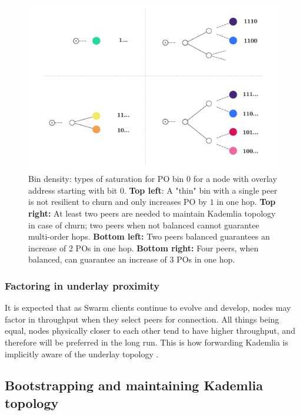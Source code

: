 \begin{figure}[htbp]
   \centering
   \includegraphics[width=\textwidth]{fig/bindensity.pdf}
   \caption[Bin density \statusgreen]{Bin density:  types of saturation for PO bin $0$ for a node with overlay address starting with bit $0$. \textbf{Top left}: A "thin" bin with a single peer is not resilient to churn and only increases PO by $1$ in one hop. \textbf{Top right:} At least two peers are needed to maintain Kademlia topology in case of churn; two peers when not balanced cannot guarantee multi-order hops. \textbf{Bottom left:} Two peers balanced guarantees an increase of 2 POs in one hop. \textbf{Bottom right:} Four peers, when balanced, can guarantee an increase of $3$ POs in one hop.}
   \label{fig:bindensity}
\end{figure}

\subsubsection{Factoring in underlay proximity}
It is expected that as Swarm clients continue to evolve and develop, nodes may factor in throughput when they select peers for connection. All things being equal, nodes physically closer to each other tend to have higher throughput, and therefore will be preferred in the long run. This is how forwarding Kademlia is implicitly aware of the underlay topology \cite{heep2010r}. 


\subsection{Bootstrapping and maintaining Kademlia topology \statusgreen}\label{sec:bootstrapping}
 

